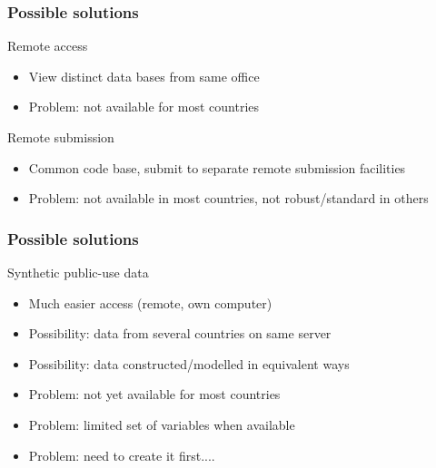 \begin{frame}
\frametitle{Possible solutions}
\begin{block}{Remote access}
\begin{itemize}[<+->]
\item View distinct data bases from same office
\item Problem: not available for most countries
\end{itemize}
\end{block}
\pause
\begin{block}{Remote submission}
\begin{itemize}[<+->]
\item Common code base, submit to separate remote submission facilities
\item Problem: not available in most countries, not robust/standard in others
\end{itemize}
\end{block}



\end{frame}

\begin{frame}
\frametitle{Possible solutions}
\begin{block}{Synthetic public-use data}
\begin{itemize}[<+->]
\item Much easier access (remote, own computer)
\item Possibility: data from several countries on same server
\item Possibility: data constructed/modelled in equivalent ways
\item Problem: not yet available for most countries
\item Problem: limited set of variables when available
\item Problem: need to create it first....
\end{itemize}
\end{block}

\end{frame}

